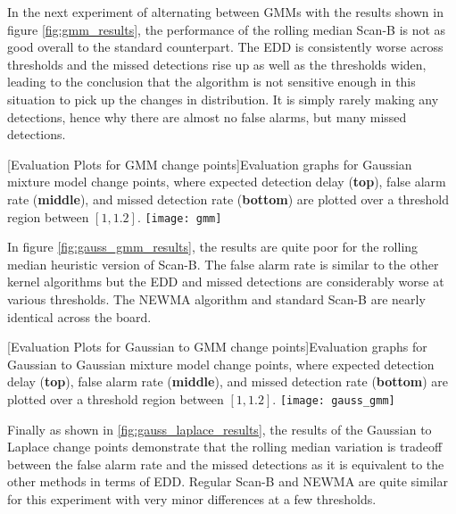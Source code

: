 In the next experiment of alternating between GMMs with the results shown in figure \ref{fig:gmm_results}, the performance of the rolling median Scan-B is not as good overall to the standard counterpart. The EDD is consistently worse across thresholds and the missed detections rise up as well as the thresholds widen, leading to the conclusion that the algorithm is not sensitive enough in this situation to pick up the changes in distribution. It is simply rarely making any detections, hence why there are almost no false alarms, but many missed detections.

\begin{minipage}{\textwidth}
\begin{center} 
[Evaluation Plots for GMM change points]{Evaluation graphs for Gaussian mixture model change points, where expected detection delay (\textbf{top}), false alarm rate (\textbf{middle}), and missed detection rate (\textbf{bottom}) are plotted over a threshold region between $[1,1.2]$. } 
\texttt{[image: gmm]} 
\label{fig:gmm_results} 
\end{center}
\end{minipage}

In figure \ref{fig:gauss_gmm_results}, the results are quite poor for the rolling median heuristic version of Scan-B. The false alarm rate is similar to the other kernel algorithms but the EDD and missed detections are considerably worse at various thresholds. The NEWMA algorithm and standard Scan-B are nearly identical across the board.

\begin{minipage}{\textwidth}
\begin{center} 
[Evaluation Plots for Gaussian to GMM change points]{Evaluation graphs for Gaussian to Gaussian mixture model change points, where expected detection delay (\textbf{top}), false alarm rate (\textbf{middle}), and missed detection rate (\textbf{bottom}) are plotted over a threshold region between $[1,1.2]$. } 
\texttt{[image: gauss\_gmm]} 
\label{fig:gauss_gmm_results} 
\end{center}
\end{minipage}

Finally as shown in \ref{fig:gauss_laplace_results}, the results of the Gaussian to Laplace change points demonstrate that the rolling median variation is tradeoff between the false alarm rate and the missed detections as it is equivalent to the other methods in terms of EDD. Regular Scan-B and NEWMA are quite similar for this experiment with very minor differences at a few thresholds.

